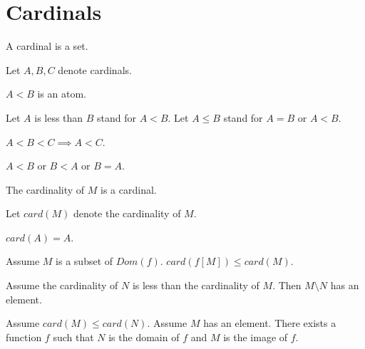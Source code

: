 \documentclass{article}
\begin{document}
  \section{Cardinals}

\begin{forthel}
    \begin{signature}
      A cardinal is a set.
    \end{signature}

    Let $A,B,C$ denote cardinals.
    \begin{signature}
      $A < B$ is an atom.
    \end{signature}
    
    Let $A$ is less than $B$ stand for $A < B$.
    Let $A \leq B$ stand for $A = B$ or $A < B$.

    \begin{axiom}
      $A < B < C \implies A < C$.
    \end{axiom}

    \begin{axiom}
      $A < B$ or $B < A$ or $B = A$.
    \end{axiom}

    \begin{signature}
      The cardinality of $M$ is a cardinal.
    \end{signature}

    Let $card(M)$ denote the cardinality of $M$.

    \begin{axiom}
      $card(A) = A$.
    \end{axiom}

    \begin{axiom}[ImageCard]
      Assume $M$ is a subset of $Dom(f)$. $card(f[M]) \leq card(M)$.
    \end{axiom}

    \begin{axiom}
      Assume the cardinality of $N$ is less than the cardinality of $M$. 
Then $M \setminus N$ has an element.
    \end{axiom}

    \begin{axiom}[SurjExi]
      Assume $card(M) \leq card(N)$. Assume $M$ has an element. There exists a
      function $f$ such that $N$ is the domain of $f$ and $M$ is the image of $f$.
    \end{axiom}

\end{forthel}
\end{document}
